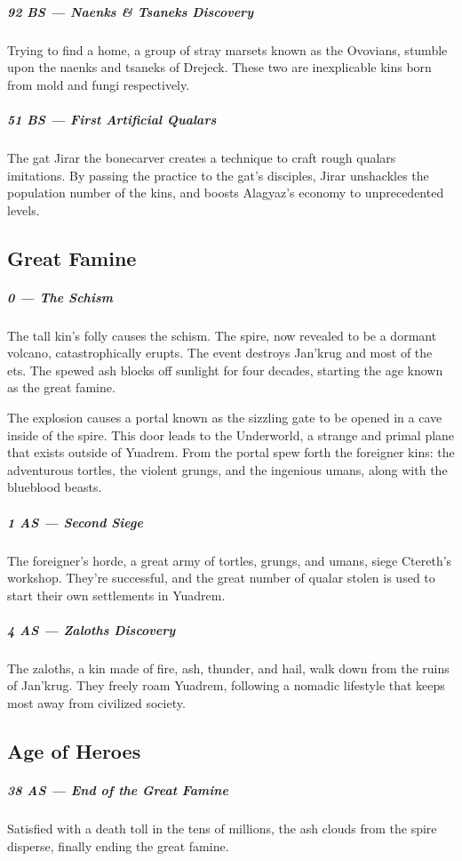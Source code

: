 \subparagraph{92 BS --- Naenks \& Tsaneks Discovery} Trying to find a home, a group of stray marsets known as the Ovovians, stumble upon the naenks and tsaneks of Drejeck.
These two are inexplicable kins born from mold and fungi respectively.

\subparagraph{51 BS --- First Artificial Qualars} The gat Jirar the bonecarver creates a technique to craft rough qualars imitations.
By passing the practice to the gat's disciples, Jirar unshackles the population number of the kins, and boosts Alagyaz's economy to unprecedented levels.

\subsection*{Great Famine}
\subparagraph{0 --- The Schism} The tall kin's folly causes the schism.
The spire, now revealed to be a dormant volcano, catastrophically erupts.
The event destroys Jan'krug and most of the ets.
The spewed ash blocks off sunlight for four decades, starting the age known as the great famine.

The explosion causes a portal known as the sizzling gate to be opened in a cave inside of the spire.
This door leads to the Underworld, a strange and primal plane that exists outside of Yuadrem.
From the portal spew forth the foreigner kins: the adventurous tortles, the violent grungs, and the ingenious umans, along with the blueblood beasts.

\subparagraph{1 AS --- Second Siege} The foreigner's horde, a great army of tortles, grungs, and umans, siege Ctereth's workshop.
They're successful, and the great number of qualar stolen is used to start their own settlements in Yuadrem.

\subparagraph{4 AS --- Zaloths Discovery} The zaloths, a kin made of fire, ash, thunder, and hail, walk down from the ruins of Jan'krug.
They freely roam Yuadrem, following a nomadic lifestyle that keeps most away from civilized society.

\subsection*{Age of Heroes}
\subparagraph{38 AS --- End of the Great Famine} Satisfied with a death toll in the tens of millions, the ash clouds from the spire disperse, finally ending the great famine.

